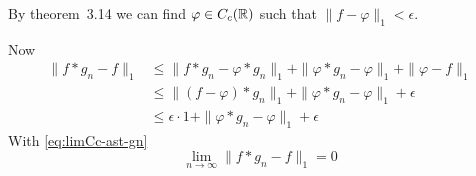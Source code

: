 \begin{enumerate}
By theorem~3.14 we can find \(\varphi\in C_c(\R)\)
such that
\(\|f-\varphi\|_1 < \epsilon\).
\iffalse
Find \(0<A<\infty\) such that \(\int_{|x|>A}|f(x)|\,dx < \epsilon\)
and \(supp \varphi \subset [-A,A]\).
By Lusin's theorem~2.24 we can approximate \(f\cdot\chhi_{[-A,A]}\)
with a function \(\varphi\in C_c(\R)\) such that
\begin{equation*}
m\left(\{x\in\R: f(x) \neq \varphi(x)\}\right) < \epsilon\,/
\end{equation*}
\fi

Now
\begin{align*}
\|f\ast g_n - f\|_1
&\leq 
    \|f\ast g_n - \varphi \ast g_n\|_1
  + \|\varphi \ast g_n - \varphi\|_1
  + \|\varphi - f\|_1 \\
&\leq \|(f-\varphi)\ast g_n\|_1 + \|\varphi \ast g_n - \varphi\|_1 + \epsilon \\
&\leq \epsilon\cdot 1 +  \|\varphi \ast g_n - \varphi\|_1 + \epsilon
\end{align*}
With \eqref{eq:limCc-ast-gn}
\begin{equation*}
\lim_{n\to\infty} \|f\ast g_n - f\|_1 = 0
\end{equation*}


\end{enumerate}
